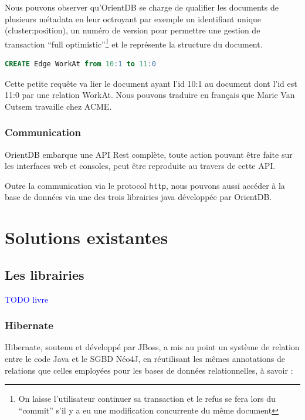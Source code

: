 \documentclass[a4paper,fleqn,12pt]{report}
\begin{document}
Nous pouvons observer qu'OrientDB se charge de qualifier les documents de plusieurs métadata en leur octroyant par exemple un identifiant unique (\no cluster:position), un numéro de version pour permettre une gestion de transaction \enquote{full optimistic}\footnote{On laisse l'utilisateur continuer sa transaction et le refus se fera lors du \enquote{commit} s'il y a eu une modification concurrente du même document} et le \@class représente la structure du document.

\begin{lstlisting}[language=SQL]
CREATE Edge WorkAt from 10:1 to 11:0
\end{lstlisting}

Cette petite requête va lier le document ayant l'id 10:1 au document dont l'id est 11:0 par une relation WorkAt. Nous pouvons traduire en français que Marie Van Cutsem travaille chez ACME.\cite{OrientDBGettingStarted}


\subsection{Communication}

OrientDB embarque une API Rest complète\cite{fielding2000architectural}, toute action pouvant être faite sur les interfaces web et consoles, peut être reproduite au travers de cette API.

Outre la communication via le protocol \texttt{http}, nous pouvons aussi accéder à la base de données via une des trois librairies java développée par OrientDB.


\chapter{Solutions existantes}


\section{Les librairies} 

\textcolor{blue}{TODO livre}

\subsection{Hibernate}

Hibernate, soutenu et développé par JBoss, a mis au point un système de relation entre le code Java et le SGBD Néo4J, en réutilisant les mêmes annotations de relations que celles employées pour les bases de données relationnelles, à savoir :
\end{document}

